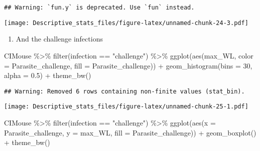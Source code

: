 \documentclass[
]{article}
\newenvironment{Shaded}{\begin{snugshade}}{\end{snugshade}}
\newcommand{\AttributeTok}[1]{\textcolor[rgb]{0.77,0.63,0.00}{#1}}
\newcommand{\DecValTok}[1]{\textcolor[rgb]{0.00,0.00,0.81}{#1}}
\newcommand{\FloatTok}[1]{\textcolor[rgb]{0.00,0.00,0.81}{#1}}
\newcommand{\FunctionTok}[1]{\textcolor[rgb]{0.00,0.00,0.00}{#1}}
\newcommand{\NormalTok}[1]{#1}
\newcommand{\SpecialCharTok}[1]{\textcolor[rgb]{0.00,0.00,0.00}{#1}}
\newcommand{\StringTok}[1]{\textcolor[rgb]{0.31,0.60,0.02}{#1}}
\providecommand{\tightlist}{%
  \setlength{\itemsep}{0pt}\setlength{\parskip}{0pt}}
\begin{document}
\begin{verbatim}
## Warning: `fun.y` is deprecated. Use `fun` instead.
\end{verbatim}

\texttt{[image: Descriptive\_stats\_files/figure-latex/unnamed-chunk-24-3.pdf]}

\begin{enumerate}
\def\labelenumi{\arabic{enumi}.}
\setcounter{enumi}{1}
\tightlist
\item
  And the challenge infections
\end{enumerate}

\begin{Shaded}
\begin{Highlighting}[]
\NormalTok{CIMouse }\SpecialCharTok{\%\textgreater{}\%}
    \FunctionTok{filter}\NormalTok{(infection }\SpecialCharTok{==} \StringTok{"challenge"}\NormalTok{)  }\SpecialCharTok{\%\textgreater{}\%}
  \FunctionTok{ggplot}\NormalTok{(}\FunctionTok{aes}\NormalTok{(max\_WL, }\AttributeTok{color =}\NormalTok{ Parasite\_challenge, }\AttributeTok{fill =}\NormalTok{ Parasite\_challenge)) }\SpecialCharTok{+}
  \FunctionTok{geom\_histogram}\NormalTok{(}\AttributeTok{bins =} \DecValTok{30}\NormalTok{, }\AttributeTok{alpha =} \FloatTok{0.5}\NormalTok{) }\SpecialCharTok{+}
    \FunctionTok{theme\_bw}\NormalTok{()}
\end{Highlighting}
\end{Shaded}

\begin{verbatim}
## Warning: Removed 6 rows containing non-finite values (stat_bin).
\end{verbatim}

\texttt{[image: Descriptive\_stats\_files/figure-latex/unnamed-chunk-25-1.pdf]}

\begin{Shaded}
\begin{Highlighting}[]
\NormalTok{CIMouse  }\SpecialCharTok{\%\textgreater{}\%}
    \FunctionTok{filter}\NormalTok{(infection }\SpecialCharTok{==} \StringTok{"challenge"}\NormalTok{)  }\SpecialCharTok{\%\textgreater{}\%}
  \FunctionTok{ggplot}\NormalTok{(}\FunctionTok{aes}\NormalTok{(}\AttributeTok{x =}\NormalTok{ Parasite\_challenge, }\AttributeTok{y =}\NormalTok{ max\_WL, }\AttributeTok{fill =}\NormalTok{ Parasite\_challenge)) }\SpecialCharTok{+}
  \FunctionTok{geom\_boxplot}\NormalTok{() }\SpecialCharTok{+}
    \FunctionTok{theme\_bw}\NormalTok{()}
\end{Highlighting}
\end{Shaded}
\end{document}
